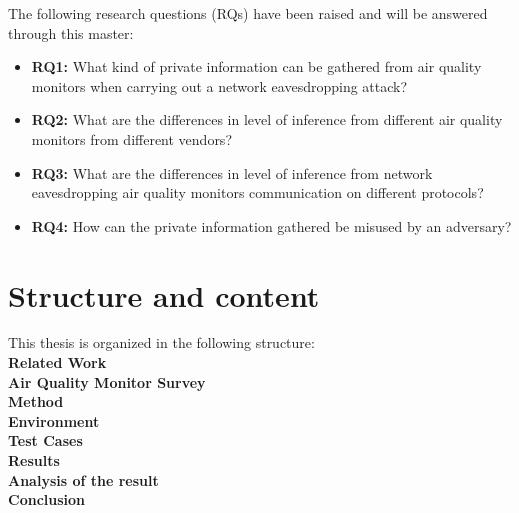 The following research questions (RQs) have been raised and will be answered through this master:
\begin{itemize}
    \item 
    \textbf{RQ1:} What kind of private information can be gathered from air quality monitors when carrying out a network eavesdropping attack?\\
    \item 
    \textbf{RQ2:} What are the differences in level of inference from different air quality monitors from different vendors?\\
    \item
    \textbf{RQ3:} What are the differences in level of inference from network eavesdropping air quality monitors communication on different protocols?\\
    \item 
    \textbf{RQ4:} How can the private information gathered be misused by an adversary?\\
\end{itemize}

\section*{Structure and content}
This thesis is organized in the following structure:\\
\textbf{Related Work}
\\
\textbf{Air Quality Monitor Survey}
\\
\textbf{Method}
\\
\textbf{Environment}
\\
\textbf{Test Cases}
\\
\textbf{Results}
\\
\textbf{Analysis of the result}
\\
\textbf{Conclusion}
\\
